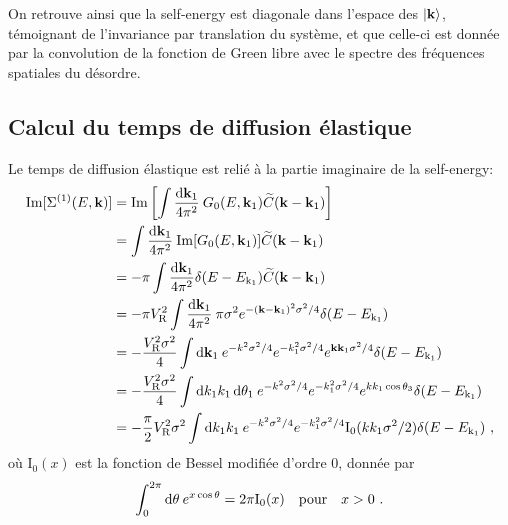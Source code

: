 On retrouve ainsi que la self-energy est diagonale dans l'espace des $\left| \mathbf{k} \right\rangle$, témoignant de l'invariance par translation du système, et que celle-ci est donnée par la convolution de la fonction de Green libre avec le spectre des fréquences spatiales du désordre.


\subsection{Calcul du temps de diffusion élastique}
Le temps de diffusion élastique est relié à la partie imaginaire de la self-energy:
\begin{align}
\mathrm{Im}[\Sigma^{(1)}(E,\mathbf{k})]&= \mathrm{Im} \left[ \int{\frac{\mathop{}\mathopen{}\mathrm{d}\mathbf{k}_{\mathrm{1}}}{4\pi^2}\: G_0(E,\mathbf{k}_{\mathrm{1}}) \widetilde{C}(\mathbf{k}-\mathbf{k}_{\mathrm{1}})}\right] \\ 
&= \int{\frac{\mathop{}\mathopen{}\mathrm{d}\mathbf{k}_{\mathrm{1}}}{4\pi^2}\: \mathrm{Im}[G_0(E,\mathbf{k}_{\mathrm{1}})] \widetilde{C}(\mathbf{k}-\mathbf{k}_{\mathrm{1}})} \\
&= -\pi \int{\frac{\mathop{}\mathopen{}\mathrm{d}\mathbf{k}_{\mathrm{1}}}{4\pi^2} \delta(E-E_{\mathrm{k}_1}) \widetilde{C}(\mathbf{k}-\mathbf{k}_{\mathrm{1}})} \\
&= - \pi V_{\mathrm{R}}^2 \int{\frac{\mathop{}\mathopen{}\mathrm{d}\mathbf{k}_{\mathrm{1}}}{4\pi^2} \: \pi \sigma^2 e^{-(\mathbf{k}-\mathbf{k}_{\mathrm{1}})^2 \sigma^2/4} \delta(E-E_{\mathrm{k}_1})} \\
&=-\frac{V_{\mathrm{R}}^2\sigma^2}{4} \int{\mathop{}\mathopen{}\mathrm{d}\mathbf{k}_{\mathrm{1}} \: e^{-k^2\sigma^2/4} e^{-k_{\mathrm{1}}^2\sigma^2/4} e^{\mathbf{k}\mathbf{k}_{\mathrm{1}}\sigma^2/4} \delta(E-E_{\mathrm{k}_1})}\\
&= -\frac{V_{\mathrm{R}}^2\sigma^2}{4} \int{\mathop{}\mathopen{}\mathrm{d}k_{\mathrm{1}} k_{\mathrm{1}} \mathop{}\mathopen{}\mathrm{d}\theta_{\mathrm{1}} \: e^{-k^2\sigma^2/4} e^{-k_{\mathrm{1}}^2\sigma^2/4} e^{k k_{\mathrm{1}} \cos{\theta_{\mathrm{3}}}} \delta(E-E_{\mathrm{k}_1})} \\
&= -\frac{\pi}{2} V_{\mathrm{R}}^2\sigma^2 \int{\mathop{}\mathopen{}\mathrm{d}k_{\mathrm{1}} k_{\mathrm{1}} \: e^{-k^2\sigma^2/4} e^{-k_{\mathrm{1}}^2\sigma^2/4} \mathrm{I_0}(k k_{\mathrm{1}}\sigma^2/2) \delta(E-E_{\mathrm{k}_1})} \text{ ,}
\end{align}
où $\mathrm{I_0}(x)$ est la fonction de Bessel modifiée d'ordre 0, donnée par
\begin{equation}
\int_{0}^{2\pi}{\mathop{}\mathopen{}\mathrm{d}\theta\:e^{x\cos\theta}}=2\pi \mathrm{I_0}(x) \quad \text{pour} \quad x>0 \text{ .}
\end{equation}


